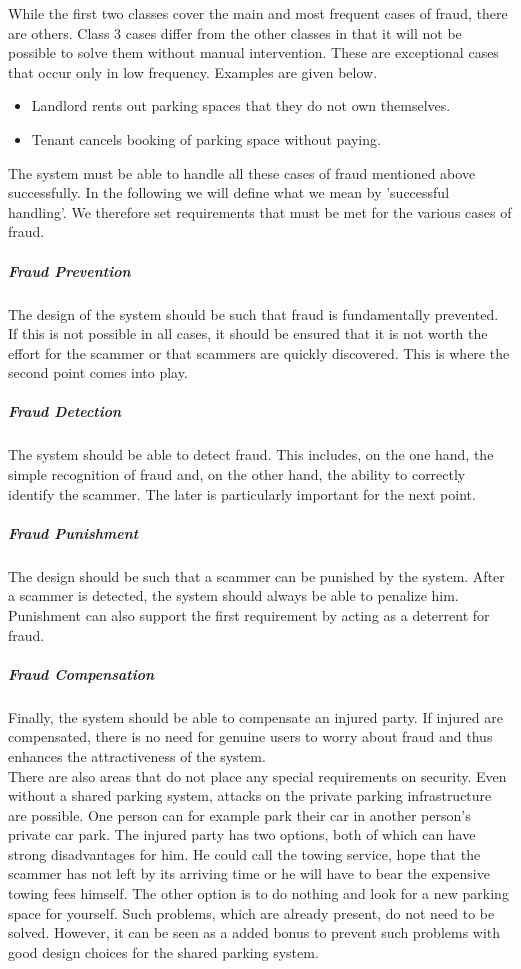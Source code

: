 \documentclass[
a4paper,     %
titlepage,   %
14pt         %
]{scrartcl}  %
\theoremstyle{mystyle}
\begin{document}
While the first two classes cover the main and most frequent cases of fraud, there are others. Class 3 cases differ from the other classes in that it will not be possible to solve them without manual intervention. These are exceptional cases that occur only in low frequency. Examples are given below.
\begin{itemize}
\item Landlord rents out parking spaces that they do not own themselves.
\item Tenant cancels booking of parking space without paying.
\end{itemize}

The system must be able to handle all these cases of fraud mentioned above successfully. In the following we will define what we mean by 'successful handling'. We therefore set requirements that must be met for the various cases of fraud.
\subparagraph{Fraud Prevention} The design of the system should be such that fraud is fundamentally prevented. If this is not possible in all cases, it should be ensured that it is not worth the effort for the scammer or that scammers are quickly discovered. This is where the second point comes into play.
\subparagraph{Fraud Detection} The system should be able to detect fraud. This includes, on the one hand, the simple recognition of fraud and, on the other hand, the ability to correctly identify the scammer. The later is particularly important for the next point.
\subparagraph{Fraud Punishment} The design should be such that a scammer can be punished by the system. After a scammer is detected, the system should always be able to penalize him. Punishment can also support the first requirement by acting as a deterrent for fraud.
\subparagraph{Fraud Compensation} Finally, the system should be able to compensate an injured party. If injured are compensated, there is no need for genuine users to worry about fraud and thus enhances the attractiveness of the system.\\

There are also areas that do not place any special requirements on security. Even without a shared parking system, attacks on the private parking infrastructure are possible. One person can for example park their car in another person's private car park. The injured party has two options, both of which can have strong disadvantages for him. He could call the towing service, hope that the scammer has not left by its arriving time or he will have to bear the expensive towing fees himself. The other option is to do nothing and look for a new parking space for yourself. Such problems, which are already present, do not need to be solved. However, it can be seen as a added bonus to prevent such problems with good design choices for the shared parking system.
\end{document}
